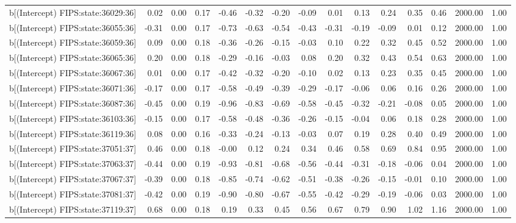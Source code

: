 \begin{table}[ht]
\begin{tabular}{rrrrrrrrrrrrrrr}
  b[(Intercept) FIPS:state:36029:36] & 0.02 & 0.00 & 0.17 & -0.46 & -0.32 & -0.20 & -0.09 & 0.01 & 0.13 & 0.24 & 0.35 & 0.46 & 2000.00 & 1.00 \\ 
  b[(Intercept) FIPS:state:36055:36] & -0.31 & 0.00 & 0.17 & -0.73 & -0.63 & -0.54 & -0.43 & -0.31 & -0.19 & -0.09 & 0.01 & 0.12 & 2000.00 & 1.00 \\ 
  b[(Intercept) FIPS:state:36059:36] & 0.09 & 0.00 & 0.18 & -0.36 & -0.26 & -0.15 & -0.03 & 0.10 & 0.22 & 0.32 & 0.45 & 0.52 & 2000.00 & 1.00 \\ 
  b[(Intercept) FIPS:state:36065:36] & 0.20 & 0.00 & 0.18 & -0.29 & -0.16 & -0.03 & 0.08 & 0.20 & 0.32 & 0.43 & 0.54 & 0.63 & 2000.00 & 1.00 \\ 
  b[(Intercept) FIPS:state:36067:36] & 0.01 & 0.00 & 0.17 & -0.42 & -0.32 & -0.20 & -0.10 & 0.02 & 0.13 & 0.23 & 0.35 & 0.45 & 2000.00 & 1.00 \\ 
  b[(Intercept) FIPS:state:36071:36] & -0.17 & 0.00 & 0.17 & -0.58 & -0.49 & -0.39 & -0.29 & -0.17 & -0.06 & 0.06 & 0.16 & 0.26 & 2000.00 & 1.00 \\ 
  b[(Intercept) FIPS:state:36087:36] & -0.45 & 0.00 & 0.19 & -0.96 & -0.83 & -0.69 & -0.58 & -0.45 & -0.32 & -0.21 & -0.08 & 0.05 & 2000.00 & 1.00 \\ 
  b[(Intercept) FIPS:state:36103:36] & -0.15 & 0.00 & 0.17 & -0.58 & -0.48 & -0.36 & -0.26 & -0.15 & -0.04 & 0.06 & 0.18 & 0.28 & 2000.00 & 1.00 \\ 
  b[(Intercept) FIPS:state:36119:36] & 0.08 & 0.00 & 0.16 & -0.33 & -0.24 & -0.13 & -0.03 & 0.07 & 0.19 & 0.28 & 0.40 & 0.49 & 2000.00 & 1.00 \\ 
  b[(Intercept) FIPS:state:37051:37] & 0.46 & 0.00 & 0.18 & -0.00 & 0.12 & 0.24 & 0.34 & 0.46 & 0.58 & 0.69 & 0.84 & 0.95 & 2000.00 & 1.00 \\ 
  b[(Intercept) FIPS:state:37063:37] & -0.44 & 0.00 & 0.19 & -0.93 & -0.81 & -0.68 & -0.56 & -0.44 & -0.31 & -0.18 & -0.06 & 0.04 & 2000.00 & 1.00 \\ 
  b[(Intercept) FIPS:state:37067:37] & -0.39 & 0.00 & 0.18 & -0.85 & -0.74 & -0.62 & -0.51 & -0.38 & -0.26 & -0.15 & -0.01 & 0.10 & 2000.00 & 1.00 \\ 
  b[(Intercept) FIPS:state:37081:37] & -0.42 & 0.00 & 0.19 & -0.90 & -0.80 & -0.67 & -0.55 & -0.42 & -0.29 & -0.19 & -0.06 & 0.03 & 2000.00 & 1.00 \\ 
  b[(Intercept) FIPS:state:37119:37] & 0.68 & 0.00 & 0.18 & 0.19 & 0.33 & 0.45 & 0.56 & 0.67 & 0.79 & 0.90 & 1.02 & 1.16 & 2000.00 & 1.00 \\ 

\end{tabular}
\end{table}
